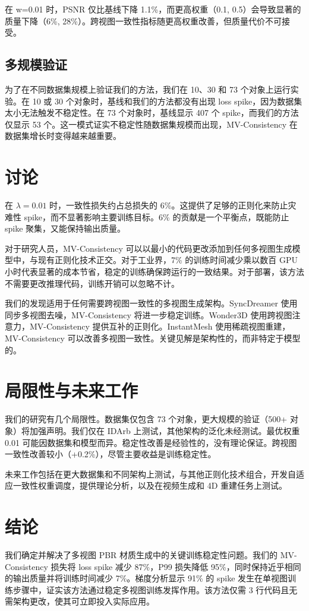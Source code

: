 \documentclass{article}
\begin{document}
在 w=0.01 时，PSNR 仅比基线下降 1.1\%，而更高权重（0.1, 0.5）会导致显著的质量下降（6\%, 28\%）。跨视图一致性指标随更高权重改善，但质量代价不可接受。

\subsection{多规模验证}

为了在不同数据集规模上验证我们的方法，我们在 10、30 和 73 个对象上运行实验。在 10 或 30 个对象时，基线和我们的方法都没有出现 loss spike，因为数据集太小无法触发不稳定性。在 73 个对象时，基线显示 407 个 spike，而我们的方法仅显示 53 个。这一模式证实不稳定性随数据集规模而出现，MV-Consistency 在数据集增长时变得越来越重要。

\section{讨论}

在 $\lambda=0.01$ 时，一致性损失约占总损失的 6\%。这提供了足够的正则化来防止灾难性 spike，而不显著影响主要训练目标。6\% 的贡献是一个平衡点，既能防止 spike 聚集，又能保持输出质量。

对于研究人员，MV-Consistency 可以以最小的代码更改添加到任何多视图生成模型中，与现有正则化技术正交。对于工业界，7\% 的训练时间减少乘以数百 GPU 小时代表显著的成本节省，稳定的训练确保跨运行的一致结果。对于部署，该方法不需要更改推理代码，训练开销可以忽略不计。

我们的发现适用于任何需要跨视图一致性的多视图生成架构。SyncDreamer 使用同步多视图去噪，MV-Consistency 将进一步稳定训练。Wonder3D 使用跨视图注意力，MV-Consistency 提供互补的正则化。InstantMesh 使用稀疏视图重建，MV-Consistency 可以改善多视图一致性。关键见解是架构性的，而非特定于模型的。

\section{局限性与未来工作}

我们的研究有几个局限性。数据集仅包含 73 个对象，更大规模的验证（500+ 对象）将加强声明。我们仅在 IDArb 上测试，其他架构的泛化未经测试。最优权重 0.01 可能因数据集和模型而异。稳定性改善是经验性的，没有理论保证。跨视图一致性改善较小（+0.2\%），尽管主要收益是训练稳定性。

未来工作包括在更大数据集和不同架构上测试，与其他正则化技术组合，开发自适应一致性权重调度，提供理论分析，以及在视频生成和 4D 重建任务上测试。

\section{结论}

我们确定并解决了多视图 PBR 材质生成中的关键训练稳定性问题。我们的 MV-Consistency 损失将 loss spike 减少 87\%，P99 损失降低 95\%，同时保持近乎相同的输出质量并将训练时间减少 7\%。梯度分析显示 91\% 的 spike 发生在单视图训练步骤中，证实该方法通过稳定多视图训练发挥作用。该方法仅需 3 行代码且无需架构更改，使其可立即投入实际应用。



\end{document}
